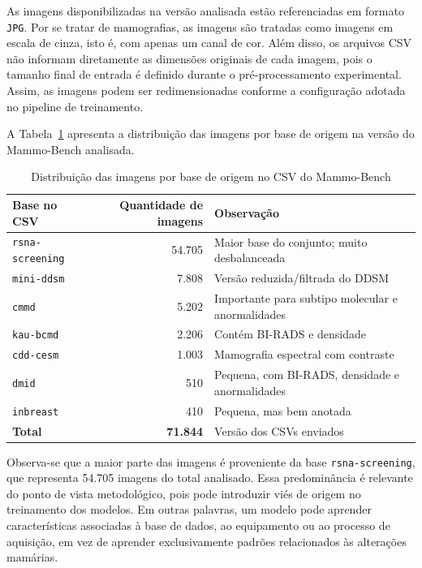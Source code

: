 \documentclass[
    12pt,
    openright,
    oneside,
    a4paper,
    english,
    brazil
]{abntex2}
\begin{document}
As imagens disponibilizadas na versão analisada estão referenciadas em formato \texttt{JPG}. Por se tratar de mamografias, as imagens são tratadas como imagens em escala de cinza, isto é, com apenas um canal de cor. Além disso, os arquivos CSV não informam diretamente as dimensões originais de cada imagem, pois o tamanho final de entrada é definido durante o pré-processamento experimental. Assim, as imagens podem ser redimensionadas conforme a configuração adotada no pipeline de treinamento.

A Tabela~\ref{tab:distribuicao_bases_mammobench} apresenta a distribuição das imagens por base de origem na versão do Mammo-Bench analisada.

\begin{table}[H]
\centering
\caption{Distribuição das imagens por base de origem no CSV do Mammo-Bench}
\label{tab:distribuicao_bases_mammobench}
\begin{tabular}{lrl}
\hline
\textbf{Base no CSV} & \textbf{Quantidade de imagens} & \textbf{Observação} \\ \hline
\texttt{rsna-screening} & 54.705 & Maior base do conjunto; muito desbalanceada \\
\texttt{mini-ddsm}      & 7.808  & Versão reduzida/filtrada do DDSM \\
\texttt{cmmd}           & 5.202  & Importante para subtipo molecular e anormalidades \\
\texttt{kau-bcmd}       & 2.206  & Contém BI-RADS e densidade \\
\texttt{cdd-cesm}       & 1.003  & Mamografia espectral com contraste \\
\texttt{dmid}           & 510    & Pequena, com BI-RADS, densidade e anormalidades \\
\texttt{inbreast}       & 410    & Pequena, mas bem anotada \\ \hline
\textbf{Total}          & \textbf{71.844} & Versão dos CSVs enviados \\ \hline
\end{tabular}
\end{table}

Observa-se que a maior parte das imagens é proveniente da base \texttt{rsna-screening}, que representa 54.705 imagens do total analisado. Essa predominância é relevante do ponto de vista metodológico, pois pode introduzir viés de origem no treinamento dos modelos. Em outras palavras, um modelo pode aprender características associadas à base de dados, ao equipamento ou ao processo de aquisição, em vez de aprender exclusivamente padrões relacionados às alterações mamárias.
\end{document}
